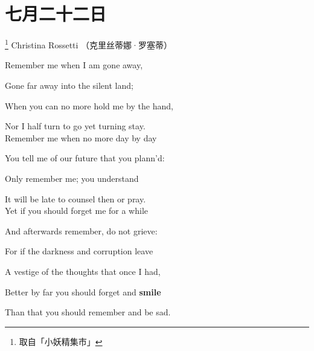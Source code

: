  \section{七月二十二日}
 {\footnote{取自「小妖精集市」}  Christina Rossetti （克里丝蒂娜·罗塞蒂）}
 {Remember me when I am gone away,
 	
 	Gone far away into the silent land;
 	
 	When you can no more hold me by the hand,
 	
 	Nor I half turn to go yet turning stay.\\
 	
 	Remember me when no more day by day
 	
 	You tell me of our future that you plann'd:
 	
 	Only remember me; you understand
 	
 	It will be late to counsel then or pray.\\
 	
 	
 	
 	Yet if you should forget me for a while
 	
 	And afterwards remember, do not grieve:
 	
 	For if the darkness and corruption leave
 	
 	A vestige of the thoughts that once I had,
 	
 	Better by far you should forget and \textbf{smile}
 	
 	Than that you should remember and be sad.}

